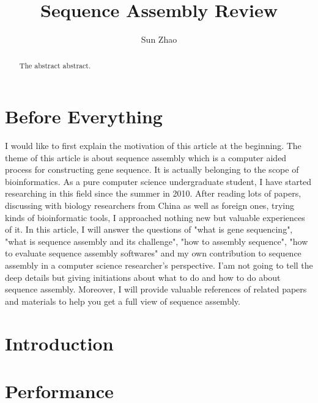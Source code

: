 \documentclass{article}
\title{Sequence Assembly Review}
\author{Sun Zhao}
\begin{document}
\maketitle
\newpage

\begin{abstract}
The abstract abstract.
\end{abstract}

\section{Before Everything}
I would like to first explain the motivation of this article at the beginning. The theme of this article is about sequence assembly which is a computer aided process for constructing gene sequence. It is actually belonging to the scope of bioinformatics. As a pure computer science undergraduate student, I have started researching in this field since the summer in 2010. After reading lots of papers, discussing with biology researchers from China as well as foreign ones, trying kinds of bioinformatic tools, I approached nothing new but valuable experiences of it. In this article, I will answer the questions of "what is gene sequencing", "what is sequence assembly and its challenge", "how to assembly sequence", "how to evaluate sequence assembly softwares" and my own contribution to sequence assembly in a computer science researcher's perspective. I'am not going to tell the deep details but giving initiations about what to do and how to do about sequence assembly. Moreover, I will provide valuable references of related papers and materials to help you get a full view of sequence assembly.  
\section{Introduction}

\section{Performance}
\end{document}
